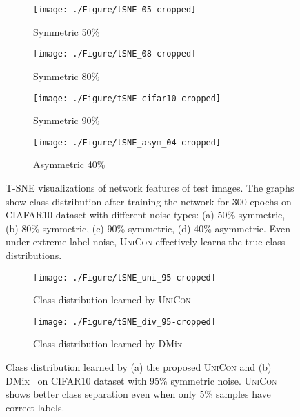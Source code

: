 \documentclass[10pt,twocolumn,letterpaper]{article}
\begin{document}
\begin{figure*}[ht]
  \centering
  \begin{subfigure}{0.45\linewidth}
    \texttt{[image: ./Figure/tSNE\_05-cropped]}
    \caption{Symmetric 50\%}
    \label{fig:tsNE_50}
  \end{subfigure}
  \hfill
\begin{subfigure}{0.45\linewidth}
    \texttt{[image: ./Figure/tSNE\_08-cropped]}
    \caption{Symmetric 80\%}
    \label{fig:tSNE_80}
  \end{subfigure}

  \begin{subfigure}{0.45\linewidth}
  \vspace{5mm}
    \texttt{[image: ./Figure/tSNE\_cifar10-cropped]}
    \caption{Symmetric 90\%}
    \label{fig:tSNE_90}
  \end{subfigure}
  \hfill
\begin{subfigure}{0.45\linewidth}
  \vspace{5mm}
    \texttt{[image: ./Figure/tSNE\_asym\_04-cropped]}
    \caption{Asymmetric 40\%}
    \label{fig:tSNE_40}
  \end{subfigure}
  \caption{T-SNE visualizations of network features of test images. The graphs show class distribution after training the network for 300 epochs on CIAFAR10 dataset with different noise types: (a) 50\% symmetric, (b) 80\% symmetric, (c) 90\% symmetric, (d) 40\% asymmetric. Even under extreme label-noise, \textsc{UniCon} effectively learns the true class distributions.}
  \label{fig:tSNE}
\end{figure*}

\begin{figure*}[ht]
  \centering
  \begin{subfigure}{0.45\linewidth}
  \vspace{5mm}
    \texttt{[image: ./Figure/tSNE\_uni\_95-cropped]}
    \caption{Class distribution learned by \textsc{UniCon}}
    \label{fig:tsNE_uni}
  \end{subfigure}
  \hfill
\begin{subfigure}{0.45\linewidth}
  \vspace{5mm}
    \texttt{[image: ./Figure/tSNE\_div\_95-cropped]}
    \caption{Class distribution learned by DMix~\cite{li2020dividemix}}
    \label{fig:tSNE_div}
  \end{subfigure}
  \caption{Class distribution learned by (a) the proposed \textsc{UniCon}  and (b) DMix~\cite{li2020dividemix} on CIFAR10 dataset with 95\% symmetric noise. \textsc{UniCon} shows better class separation even when only 5\% samples have correct labels.}
  \label{fig:tSNE_95}
\end{figure*}
\end{document}
